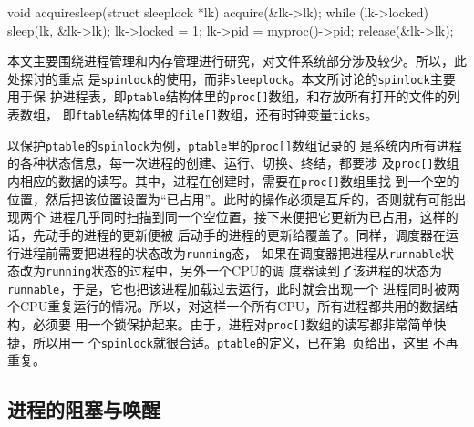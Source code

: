 \documentclass{swfuthesism}
\begin{document}
\begin{listing}
  \begin{codeblock}
\begin{ccode}
void
acquiresleep(struct sleeplock *lk)
{
  acquire(&lk->lk);
  while (lk->locked) {
    sleep(lk, &lk->lk);
  }
  lk->locked = 1;
  lk->pid = myproc()->pid;
  release(&lk->lk);
}
\end{ccode}
  \end{codeblock}
  \label{src:acquiresleep}
\end{listing}

本文主要围绕进程管理和内存管理进行研究，对文件系统部分涉及较少。所以，此处探讨的重点
是\texttt{spinlock}的使用，而非\texttt{sleeplock}。本文所讨论的\texttt{spinlock}主要用于保
护进程表，即\texttt{ptable}结构体里的\texttt{proc[]}数组，和存放所有打开的文件的列表数组，
即\texttt{ftable}结构体里的\texttt{file[]}数组，还有时钟变量\texttt{ticks}。

以保护\texttt{ptable}的\texttt{spinlock}为例，\texttt{ptable}里的\texttt{proc[]}数组记录的
是系统内所有进程的各种状态信息，每一次进程的创建、运行、切换、终结，都要涉
及\texttt{proc[]}数组内相应的数据的读写。其中，进程在创建时，需要在\texttt{proc[]}数组里找
到一个空的位置，然后把该位置设置为``已占用''。此时的操作必须是互斥的，否则就有可能出现两个
进程几乎同时扫描到同一个空位置，接下来便把它更新为已占用，这样的话，先动手的进程的更新便被
后动手的进程的更新给覆盖了。同样，调度器在运行进程前需要把进程的状态改为\texttt{running}态，
如果在调度器把进程从\texttt{runnable}状态改为\texttt{running}状态的过程中，另外一个CPU的调
度器读到了该进程的状态为\texttt{runnable}，于是，它也把该进程加载过去运行，此时就会出现一个
进程同时被两个CPU重复运行的情况。所以，对这样一个所有CPU，所有进程都共用的数据结构，必须要
用一个锁保护起来。由于，进程对\texttt{proc[]}数组的读写都非常简单快捷，所以用一
个\texttt{spinlock}就很合适。\texttt{ptable}的定义，已在第~\pageref{fig:ptable}页给出，这里
不再重复。

\subsection{进程的阻塞与唤醒}
\end{document}
